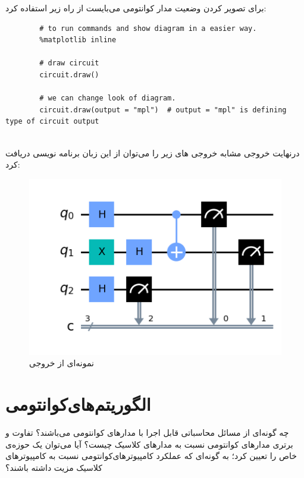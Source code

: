 \documentclass{book}
\begin{document}
برای تصویر کردن وضعیت مدار کوانتومی می‌بایست از راه زیر استفاده کرد:

\begin{latin}
	\begin{verbatim}
		# to run commands and show diagram in a easier way.
		%matplotlib inline 
		
		# draw circuit
		circuit.draw()
		
		# we can change look of diagram.
		circuit.draw(output = "mpl")  # output = "mpl" is defining type of circuit output
		
	\end{verbatim}
\end{latin}



درنهایت خروجی مشابه خروجی های زیر را می‌توان از این زبان برنامه نویسی دریافت کرد:

\begin{center}
	\begin{figure}[ht]
		\centering
		\includegraphics[]{tutorials_circuits_advanced_03_advanced_circuit_visualization_7_0.png}
		\caption{نمونه‌ای از خروجی }
	\end{figure}
	
\end{center}

\chapter{الگوریتم‌های‌کوانتومی‌}


چه گونه‌ای از مسائل محاسباتی قابل اجرا با مدارهای کوانتومی می‌باشند؟ 
تفاوت و برتری مدار‌های کوانتومی نسبت به مدار‌های کلاسیک چیست؟
آیا می‌توان یک حوزه‌ی خاص را تعیین کرد؛ به گونه‌ای که عملکرد کامپیوترهای‌‌کوانتومی نسبت به کامپیوتر‌های کلاسیک مزیت داشته باشند؟
\end{document}

